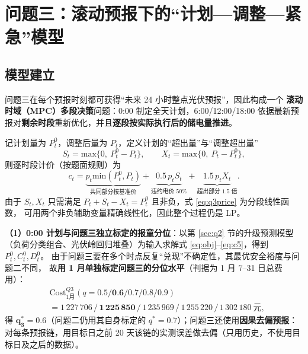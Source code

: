\section{问题三\nobreak：滚动预报下的“计划—调整—紧急\nobreak”模型}
\label{sec:q3}

\subsection{模型建立}

问题三在每个预报时刻都可获得“未来 24 小时整点光伏预报\nobreak”\nobreak，因此构成一个
\textbf{滚动时域（MPC\nobreak）多段决策}问题\nobreak：0:00 制定全天计划\nobreak，6:00/12:00/18:00
依据最新预报对\textbf{剩余时段}重新优化\nobreak，并且\textbf{逐段按实际执行后的储电量推进}\nobreak。

记计划量为 $P^0_t$\nobreak，调整后量为 $P_t$\nobreak，定义计划的“超出量\nobreak”与“调整超出量\nobreak”
\begin{equation}
S_t=\text{max}\{0,\ P^0_t-P_t\},\qquad X_t=\text{max}\{0,\ P_t-P^0_t\},
\label{eq:SX}
\end{equation}
则逐时段计价（按题面规则\nobreak）为
\begin{equation}
c_t=\underbrace{p_t\text{min}(P^0_t,P_t)}_{\text{共同部分按基准价}}
+\underbrace{0.5\,p_t S_t}_{\text{违约电价 50\%}}
+\underbrace{1.5\,p_t X_t}_{\text{超出部分 1.5 倍}} .
\label{eq:q3price}
\end{equation}
由于 $S_t,X_t$ 只需满足 $P_t+S_t-X_t=P^0_t$ 且非负\nobreak，式 \eqref{eq:q3price} 为分段线性函数\nobreak，
可用两个非负辅助变量精确线性化\nobreak，因此整个过程仍是 LP\nobreak。

\textbf{（1\nobreak）0:00 计划与问题三独立标定的报童分位}\nobreak：以第 \ref{sec:q2} 节的升级预测模型
（负荷分类组合\nobreak、光伏岭回归堆叠\nobreak）为输入求解式 \eqref{eq:obj}--\eqref{eq:c5}\nobreak，得到 $P^0_t,C^0_t,D^0_t$\nobreak。
由于问题三要在多个时点反复“兑现\nobreak”不确定性\nobreak，其最优安全裕度与问题二不同\nobreak，
故\textbf{用 1 月单独标定问题三的分位水平}（判据为 1 月 7--31 日总费用）\nobreak：
\begin{equation}
\begin{aligned}
&\mathrm{Cost}_{1\text{月}}^{Q3}(q=0.5/\textbf{0.6}/0.7/0.8/0.9)\\
&=1\,227\,706\,/\,\bm{1\,225\,850}\,/\,1\,235\,969\,/\,1\,255\,220\,/\,1\,302\,180\ \text{元},
\end{aligned}
\label{eq:qtune3}
\end{equation}
得 $\bm{q_3^*=0.6}$（问题二仍用其自身标定的 $q^*=0.7$\nobreak）；问题三还使用\textbf{因果去偏预报}\nobreak：
对每条预报链\nobreak，用目标日之前 20 天该链的实测误差做去偏（只用历史\nobreak，不使用目标日及之后的数据\nobreak）\nobreak。


